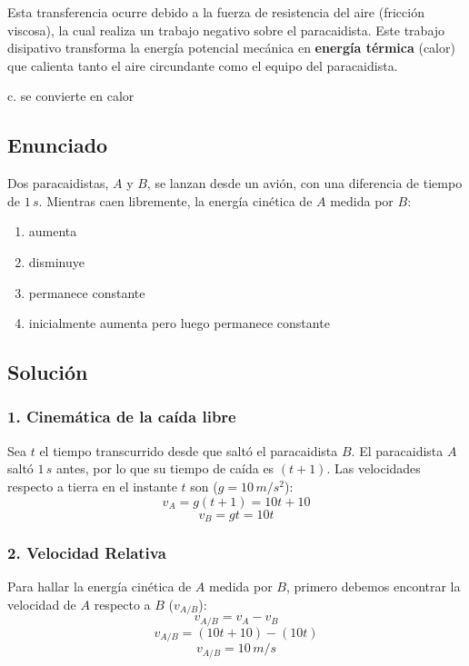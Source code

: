 \documentclass[12pt, a4paper]{article}
\begin{document}
Esta transferencia ocurre debido a la fuerza de resistencia del aire (fricción viscosa), la cual realiza un trabajo negativo sobre el paracaidista. Este trabajo disipativo transforma la energía potencial mecánica en \textbf{energía térmica} (calor) que calienta tanto el aire circundante como el equipo del paracaidista.

\begin{tcolorbox}[colback=green!5!white, colframe=green!50!black, title=Respuesta Correcta]
\centering \Large c. se convierte en calor
\end{tcolorbox}

\newpage

\subsection*{Enunciado}
Dos paracaidistas, $A$ y $B$, se lanzan desde un avión, con una diferencia de tiempo de $1 \, \si{s}$. Mientras caen libremente, la energía cinética de $A$ medida por $B$:
\begin{enumerate}[label=\alph*.]
    \item aumenta
    \item disminuye
    \item permanece constante
    \item inicialmente aumenta pero luego permanece constante
\end{enumerate}

\subsection*{Solución}

\subsubsection*{1. Cinemática de la caída libre}
Sea $t$ el tiempo transcurrido desde que saltó el paracaidista $B$. El paracaidista $A$ saltó $1 \, \si{s}$ antes, por lo que su tiempo de caída es $(t+1)$.
Las velocidades respecto a tierra en el instante $t$ son ($g = 10 \, \si{m/s^2}$):
$$v_A = g(t+1) = 10t + 10$$
$$v_B = gt = 10t$$

\subsubsection*{2. Velocidad Relativa}
Para hallar la energía cinética de $A$ medida por $B$, primero debemos encontrar la velocidad de $A$ respecto a $B$ ($v_{A/B}$):
$$v_{A/B} = v_A - v_B$$
$$v_{A/B} = (10t + 10) - (10t)$$
$$v_{A/B} = 10 \, \si{m/s}$$
\end{document}
